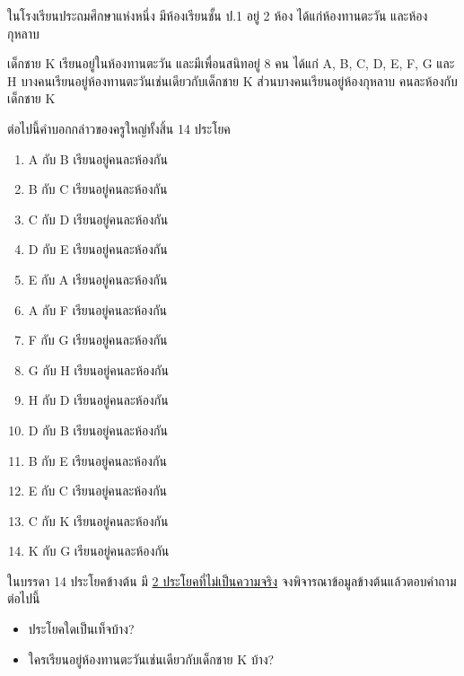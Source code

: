 \question{}

ในโรงเรียนประถมศึกษาแห่งหนึ่ง มีห้องเรียนชั้น ป.1 อยู่ 2 ห้อง ได้แก่ห้องทานตะวัน และห้องกุหลาบ

เด็กชาย K เรียนอยู่ในห้องทานตะวัน และมีเพื่อนสนิทอยู่ 8 คน ได้แก่ A, B, C, D, E, F, G และ H\;\;
บางคนเรียนอยู่ห้องทานตะวันเช่นเดียวกับเด็กชาย K \;
ส่วนบางคนเรียนอยู่ห้องกุหลาบ คนละห้องกับเด็กชาย K

ต่อไปนี้คำบอกกล่าวของครูใหญ่ทั้งสิ้น 14 ประโยค

\begin{multicols}{2}
    \begin{enumerate}
        \item A กับ B เรียนอยู่คนละห้องกัน
        \item B กับ C เรียนอยู่คนละห้องกัน
        \item C กับ D เรียนอยู่คนละห้องกัน
        \item D กับ E เรียนอยู่คนละห้องกัน
        \item E กับ A เรียนอยู่คนละห้องกัน
        \item A กับ F เรียนอยู่คนละห้องกัน
        \item F กับ G เรียนอยู่คนละห้องกัน
        \item G กับ H เรียนอยู่คนละห้องกัน
        \item H กับ D เรียนอยู่คนละห้องกัน
        \item D กับ B เรียนอยู่คนละห้องกัน
        \item B กับ E เรียนอยู่คนละห้องกัน
        \item E กับ C เรียนอยู่คนละห้องกัน
        \item C กับ K เรียนอยู่คนละห้องกัน
        \item K กับ G เรียนอยู่คนละห้องกัน
    \end{enumerate}
\end{multicols}

ในบรรดา 14 ประโยคข้างต้น มี \uline{2 ประโยคที่ไม่เป็นความจริง} 
จงพิจารณาข้อมูลข้างต้นแล้วตอบคำถามต่อไปนี้
\begin{itemize}
\item ประโยคใดเป็นเท็จบ้าง?
\item ใครเรียนอยู่ห้องทานตะวันเช่นเดียวกับเด็กชาย K บ้าง?
\end{itemize}

